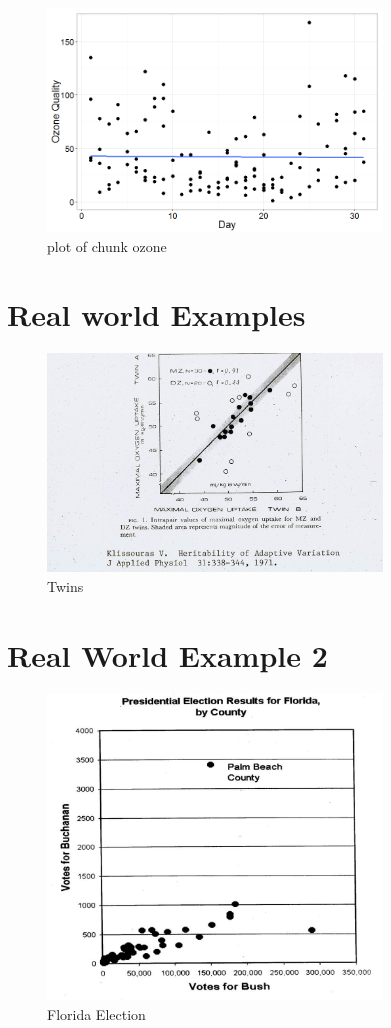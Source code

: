 \documentclass[12pt]{article}
\begin{document}
\begin{figure}[H]
\centering
\includegraphics[width=3.5in]{figure/ozone-1.png}
\caption{plot of chunk ozone}
\end{figure}

\section{Real world Examples}\label{real-world-examples}

\begin{figure}[H]
\centering
\includegraphics[width=3.5in]{twins.jpg}
\caption{Twins}
\end{figure}

\section{Real World Example 2}\label{real-world-example-2}

\begin{figure}[H]
\centering
\includegraphics[width=3.5in]{floridaBB.jpg}
\caption{Florida Election}
\end{figure}
\end{document}
